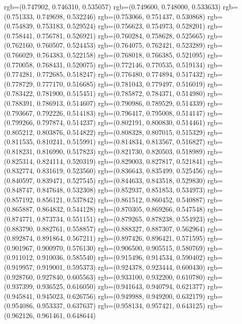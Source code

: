 {{{					rgb=(0.747902, 0.746310, 0.535057)
					rgb=(0.749600, 0.748000, 0.533633)
					rgb=(0.751333, 0.749698, 0.532246)
					rgb=(0.753066, 0.751437, 0.530868)
					rgb=(0.754839, 0.753183, 0.529524)
					rgb=(0.756623, 0.754973, 0.528201)
					rgb=(0.758441, 0.756781, 0.526921)
					rgb=(0.760284, 0.758628, 0.525665)
					rgb=(0.762160, 0.760507, 0.524453)
					rgb=(0.764075, 0.762421, 0.523289)
					rgb=(0.766029, 0.764383, 0.522158)
					rgb=(0.768018, 0.766385, 0.521095)
					rgb=(0.770058, 0.768431, 0.520075)
					rgb=(0.772146, 0.770535, 0.519134)
					rgb=(0.774281, 0.772685, 0.518247)
					rgb=(0.776480, 0.774894, 0.517432)
					rgb=(0.778729, 0.777170, 0.516685)
					rgb=(0.781043, 0.779497, 0.516019)
					rgb=(0.783422, 0.781900, 0.515451)
					rgb=(0.785872, 0.784371, 0.514980)
					rgb=(0.788391, 0.786913, 0.514607)
					rgb=(0.790986, 0.789529, 0.514339)
					rgb=(0.793667, 0.792226, 0.514183)
					rgb=(0.796417, 0.795008, 0.514147)
					rgb=(0.799266, 0.797874, 0.514237)
					rgb=(0.802191, 0.800830, 0.514461)
					rgb=(0.805212, 0.803876, 0.514822)
					rgb=(0.808328, 0.807015, 0.515329)
					rgb=(0.811535, 0.810241, 0.515991)
					rgb=(0.814834, 0.813567, 0.516827)
					rgb=(0.818231, 0.816990, 0.517823)
					rgb=(0.821730, 0.820503, 0.518989)
					rgb=(0.825314, 0.824114, 0.520319)
					rgb=(0.829003, 0.827817, 0.521841)
					rgb=(0.832774, 0.831619, 0.523560)
					rgb=(0.836643, 0.835499, 0.525456)
					rgb=(0.840597, 0.839471, 0.527545)
					rgb=(0.844633, 0.843518, 0.529830)
					rgb=(0.848747, 0.847648, 0.532308)
					rgb=(0.852937, 0.851853, 0.534973)
					rgb=(0.857192, 0.856121, 0.537842)
					rgb=(0.861512, 0.860452, 0.540887)
					rgb=(0.865887, 0.864832, 0.544128)
					rgb=(0.870305, 0.869266, 0.547548)
					rgb=(0.874771, 0.873734, 0.551151)
					rgb=(0.879265, 0.878238, 0.554923)
					rgb=(0.883790, 0.882761, 0.558857)
					rgb=(0.888327, 0.887307, 0.562964)
					rgb=(0.892874, 0.891864, 0.567211)
					rgb=(0.897426, 0.896421, 0.571595)
					rgb=(0.901967, 0.900970, 0.576130)
					rgb=(0.906500, 0.905515, 0.580769)
					rgb=(0.911012, 0.910036, 0.585540)
					rgb=(0.915496, 0.914534, 0.590402)
					rgb=(0.919957, 0.919001, 0.595373)
					rgb=(0.924378, 0.923444, 0.600430)
					rgb=(0.928760, 0.927840, 0.605563)
					rgb=(0.933100, 0.932200, 0.610780)
					rgb=(0.937399, 0.936525, 0.616050)
					rgb=(0.941643, 0.940794, 0.621377)
					rgb=(0.945841, 0.945023, 0.626756)
					rgb=(0.949988, 0.949200, 0.632179)
					rgb=(0.954086, 0.953337, 0.637637)
					rgb=(0.958134, 0.957421, 0.643125)
					rgb=(0.962126, 0.961461, 0.648644)
}}}
